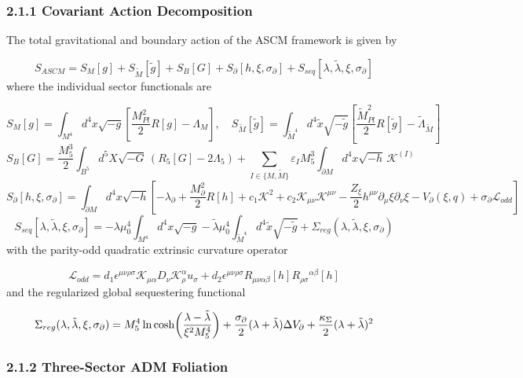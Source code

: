 \documentclass[aps,prd,onecolumn,superscriptaddress,nofootinbib,longbibliography,10pt]{revtex4-2}
\begin{document}
  
\subsubsection*{2.1.1 Covariant Action Decomposition}

  The total gravitational and boundary action of the ASCM framework is given by


  \[ S_{ASCM} = S_M[g] + S_{\tilde{M}}[\tilde{g}] + S_B[G] + S_\partial[h,\xi,\sigma_\partial] + S_{seq}[\lambda,\tilde{\lambda},\xi,\sigma_\partial] \]
  where the individual sector functionals are


  \[ S_M[g] = \int_{M^4} d^4x\sqrt{-g}\left[ \frac{M_{Pl}^2}{2}R[g] - \Lambda_M \right], \quad S_{\tilde{M}}[\tilde{g}] = \int_{\tilde{M}^4} d^4\tilde{x}\sqrt{-\tilde{g}}\left[ \frac{\tilde{M}_{Pl}^2}{2}R[\tilde{g}] - \tilde{\Lambda}_{\tilde{M}} \right] \]
  \[ S_B[G] = \frac{M_5^3}{2}\int_{B^5} d^5X\sqrt{-G}\,(R_5[G] - 2\Lambda_5) + \sum_{I\in\{M,\tilde{M}\}} \varepsilon_I M_5^3 \int_{\partial M} d^4x\sqrt{-h}\,\mathcal{K}^{(I)} \]
  \[ S_\partial[h,\xi,\sigma_\partial] = \int_{\partial M} d^4x\sqrt{-h}\left[ -\lambda_\partial + \frac{M_\partial^2}{2}R[h] + c_1\mathcal{K}^2 + c_2\mathcal{K}_{\mu\nu}\mathcal{K}^{\mu\nu} - \frac{Z_\xi}{2}h^{\mu\nu}\partial_\mu\xi\partial_\nu\xi - V_\partial(\xi,q) + \sigma_\partial\mathcal{L}_{odd} \right] \]
  \[ S_{seq}[\lambda,\tilde{\lambda},\xi,\sigma_\partial] = -\lambda\mu_0^4 \int_{M^4} d^4x\sqrt{-g} - \tilde{\lambda}\mu_0^4 \int_{\tilde{M}^4} d^4\tilde{x}\sqrt{-\tilde{g}} + \Sigma_{reg}(\lambda,\tilde{\lambda},\xi,\sigma_\partial) \]
  with the parity-odd quadratic extrinsic curvature operator


  \[ \mathcal{L}_{odd} = d_1\epsilon^{\mu\nu\rho\sigma}\mathcal{K}_{\mu\alpha}D_\nu\mathcal{K}^\alpha_\rho u_\sigma + d_2\epsilon^{\mu\nu\rho\sigma}R_{\mu\nu\alpha\beta}[h]R_{\rho\sigma}{}^{\alpha\beta}[h] \]
  and the regularized global sequestering functional


  \[ \Sigma_{reg}(\lambda, \tilde{\lambda}, \xi, \sigma_{\partial}) = M_5^4 \ln\cosh\!\left( \displaystyle\displaystyle\frac{\lambda - \tilde{\lambda}}{\xi^2 M_5^4}\right) + \frac{\sigma_\partial}{2}(\lambda + \tilde{\lambda})\Delta V_\partial + \frac{\kappa_\Sigma}{2}(\lambda + \tilde{\lambda})^2 \]

  
\subsubsection*{2.1.2 Three-Sector ADM Foliation}
\end{document}
